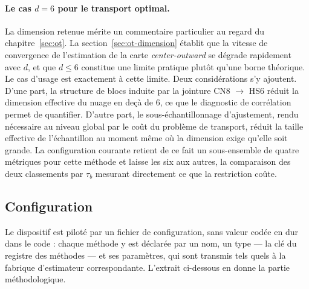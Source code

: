 \documentclass[11pt,a4paper]{article}
\theoremstyle{definition}
\theoremstyle{remark}
\begin{document}
\paragraph{Le cas $d = 6$ pour le transport optimal.} La dimension retenue mérite un
commentaire particulier au regard du chapitre~\ref{sec:ot}. La
section~\ref{sec:ot-dimension} établit que la vitesse de convergence de l'estimation de la
carte \emph{center-outward} se dégrade rapidement avec $d$, et que $d \le 6$ constitue une
limite pratique plutôt qu'une borne théorique. Le cas d'usage est exactement à cette limite.
Deux considérations s'y ajoutent. D'une part, la structure de blocs induite par la jointure
CN8 $\to$ HS6 réduit la dimension effective du nuage en deçà de $6$, ce que le diagnostic de
corrélation permet de quantifier. D'autre part, le sous-échantillonnage d'ajustement, rendu
nécessaire au niveau global par le coût du problème de transport, réduit la taille effective
de l'échantillon au moment même où la dimension exige qu'elle soit grande. La configuration
courante retient de ce fait un sous-ensemble de quatre métriques pour cette méthode et
laisse les six aux autres, la comparaison des deux classements par $\tau_b$ mesurant
directement ce que la restriction coûte.

\bigskip

\subsection{Configuration}
\label{sec:app-config}

\medskip

Le dispositif est piloté par un fichier de configuration, sans valeur codée en dur dans le
code : chaque méthode y est déclarée par un nom, un type --- la clé du registre des
méthodes --- et ses paramètres, qui sont transmis tels quels à la fabrique d'estimateur
correspondante. L'extrait ci-dessous en donne la partie méthodologique.

\medskip
\end{document}
